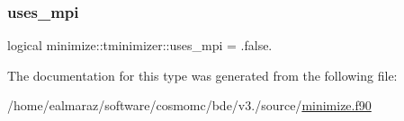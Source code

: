 \subsubsection{\texorpdfstring{uses\+\_\+mpi}{uses\_mpi}}
{\footnotesize\ttfamily logical minimize\+::tminimizer\+::uses\+\_\+mpi = .false.\hspace{0.3cm}{\ttfamily [private]}}



The documentation for this type was generated from the following file\+:\begin{DoxyCompactItemize}
\item 
/home/ealmaraz/software/cosmomc/bde/v3./source/\mbox{\hyperlink{minimize_8f90}{minimize.\+f90}}\end{DoxyCompactItemize}
